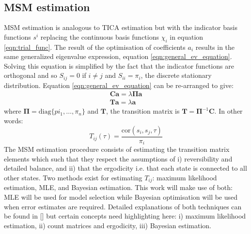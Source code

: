 \subsection{MSM estimation}
MSM estimation is analogous to TICA estimation but with the indicator basis functions $s^{i}$ replacing the continuous basis functions $\chi_{i}$ in equation \ref{eqn:trial_func}. The result of the optimisation of coefficients $a_{i}$ results in the same generalized eigenvalue expression, equation \ref{eqn:general_ev_equation}. Solving this equation is simplified by the fact that the indicator functions are orthogonal and so $S_{ij} = 0$ if $i \neq j$ and $S_{ii} = \pi_{i}$, the discrete stationary distribution. Equation \ref{eqn:general_ev_equation} can be re-arranged to give: 
\begin{align}\label{eqn:tran_def}
 \mathbf{C a}=\lambda \bm{\Pi} \mathbf{a} \\
\mathbf{T a}=\lambda \mathbf{a}   
\end{align}
where $\bm{\Pi} = \mathrm{diag}\{pi_{1}, \ldots, \pi_{n}\}$ and $\mathbf{T}$, the transition matrix is $\mathbf{T} = \bm{\Pi}^{-1}\mathbf{C}$. In other words: 
\begin{equation}\label{eqn:tran_mat_def}
    T_{ij}(\tau) =\frac{\mathrm{cor}(s_{i}, s_{j}, \tau)}{\pi_{i}}
\end{equation}
The MSM estimation procedure consists of estimating the transition matrix elements which such that they respect the assumptions of i) reversibility and detailed balance, and ii) that the ergodicity i.e. that each state is connected to all other states. Two methods exist for estimating $T_{ij}$: maximum likelihood estimation, MLE, and Bayesian estimation. This work will make use of both: MLE will be used for model selection while Bayesian optimisation will be used when error estimates are required.  Detailed explanations of both  techniques can be found in [] but certain concepts need highlighting here: i) maximum likelihood estimation, ii) count matrices and ergodicity, iii) Bayesian estimation. 

